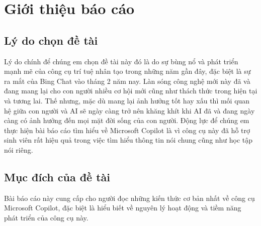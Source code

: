 \chapter{Giới thiệu báo cáo}
\section{Lý do chọn đề tài}
Lý do chính để chúng em chọn đề tài này đó là do sự bùng nổ và phát triển mạnh mẽ của công cụ trí tuệ nhân tạo trong những năm gần đây,
đặc biệt là sự ra mắt của Bing Chat vào tháng 2 năm nay. Làn sóng công nghệ mới này đã và đang mang lại cho con người nhiều cơ hội mới cũng như thách thức trong hiện tại và tương lai.
Thế nhưng, mặc dù mang lại ảnh hưởng tốt hay xấu thì mối quan hệ giữa con người và AI sẽ ngày càng trở nên khăng khít khi AI đã và đang ngày càng có ảnh hưởng đến mọi mặt đời sống của con người.
Động lực để chúng em thực hiện bài báo cáo tìm hiểu về Microsoft Copilot là vì công cụ này đã hỗ trợ sinh viên rất hiệu quả trong việc tìm hiểu thông tin nói chung cũng như học tập nói riêng.
\section{Mục đích của đề tài}
Bài báo cáo này cung cấp cho người đọc những kiến thức cơ bản nhất về công cụ Microsoft Copilot, đặc biệt là hiểu biết về
nguyên lý hoạt động và tiềm năng phát triển của công cụ này.